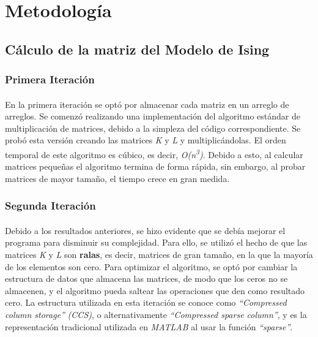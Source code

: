 \documentclass[a4paper,11pt]{article}
\begin{document}
\paragraph{}
\newpage
\section{Metodolog\'ia}
\begin{comment}
[Hay que relatar los pasos que se fueron realizando, incluyendo los modelos
utilizados, los analisis hechos, las pruebas realizadas.]
\end{comment}
\subsection{C\'alculo de la matriz del Modelo de Ising}
\paragraph{}
\subsubsection{Primera Iteraci\'on}
\paragraph{}
En la primera iteraci\'on se opt\'o por almacenar cada matriz en un arreglo de arreglos. Se comenz\'o realizando una implementaci\'on del algoritmo est\'andar de multiplicaci\'on de matrices, debido a la simpleza del c\'odigo correspondiente. Se prob\'o esta versi\'on creando las matrices \emph{K} y \emph{L} y multiplic\'andolas. El orden temporal de este algoritmo es c\'ubico, es decir, \emph{O(n\textsuperscript{3})}. Debido a esto, al calcular matrices pequeñas el algoritmo termina de forma r\'apida, sin embargo, al probar matrices de mayor tamaño, el tiempo crece en gran medida.
\subsubsection{Segunda Iteraci\'on}
\paragraph{}
Debido a los resultados anteriores, se hizo evidente que se deb\'ia mejorar el programa para disminuir su complejidad. Para ello, se utiliz\'o el hecho de que las matrices \emph{K} y \emph{L} son \textbf{ralas}, es decir, matrices de gran tamaño, en la que la mayor\'ia de los elementos son cero. Para optimizar el algoritmo, se opt\'o por cambiar la estructura de datos que almacena las matrices, de modo que los ceros no se almacenen, y el algoritmo pueda saltear las operaciones que den como resultado cero. La estructura utilizada en esta iteraci\'on se conoce como \emph{``Compressed column storage''} \emph{(CCS)}, o alternativamente \emph{``Compressed sparse column''}, y es la representaci\'on tradicional utilizada en \emph{MATLAB} al usar la funci\'on \emph{``sparse''}.
\end{document}
